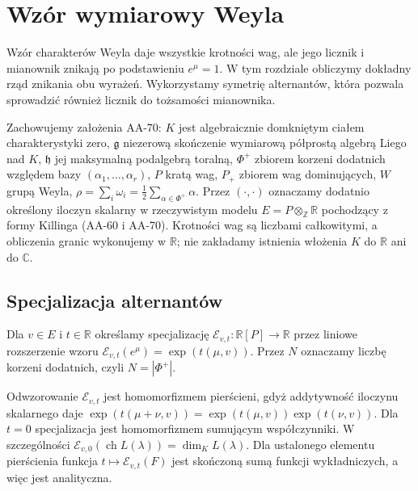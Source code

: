 \chapter{Wzór wymiarowy Weyla}
\label{aa:ch:weyl-dimension}

Wzór charakterów Weyla daje wszystkie krotności wag, ale jego licznik i mianownik znikają po podstawieniu $e^\mu=1$. W tym rozdziale obliczymy dokładny rząd znikania obu wyrażeń. Wykorzystamy symetrię alternantów, która pozwala sprowadzić również licznik do tożsamości mianownika.

Zachowujemy założenia AA-70: $K$ jest algebraicznie domkniętym ciałem charakterystyki zero, $\mathfrak g$ niezerową skończenie wymiarową półprostą algebrą Liego nad $K$, $\mathfrak h$ jej maksymalną podalgebrą toralną, $\Phi^+$ zbiorem korzeni dodatnich względem bazy $(\alpha_1,\ldots,\alpha_r)$, $P$ kratą wag, $P_+$ zbiorem wag dominujących, $W$ grupą Weyla, $\rho=\sum_i\omega_i=\frac12\sum_{\alpha\in\Phi^+}\alpha$. Przez $(\cdot,\cdot)$ oznaczamy dodatnio określony iloczyn skalarny w rzeczywistym modelu $E=P\otimes_{\mathbb Z}\mathbb R$ pochodzący z formy Killinga (AA-60 i AA-70). Krotności wag są liczbami całkowitymi, a obliczenia granic wykonujemy w $\mathbb R$; nie zakładamy istnienia włożenia $K$ do $\mathbb R$ ani do $\mathbb C$.

\section{Specjalizacja alternantów}

\begin{definicja}
\label{aa:def:weyl-exponential-specialization}
Dla $v\in E$ i $t\in\mathbb R$ określamy specjalizację
$\mathcal E_{v,t}:\mathbb R[P]\to\mathbb R$ przez liniowe rozszerzenie wzoru
$\mathcal E_{v,t}(e^\mu)=\exp(t(\mu,v))$.
Przez $N$ oznaczamy liczbę korzeni dodatnich, czyli $N=|\Phi^+|$.
\end{definicja}
Odwzorowanie $\mathcal E_{v,t}$ jest homomorfizmem pierścieni, gdyż addytywność iloczynu skalarnego daje
$\exp(t(\mu+\nu,v))=\exp(t(\mu,v))\exp(t(\nu,v))$.
Dla $t=0$ specjalizacja jest homomorfizmem sumującym współczynniki. W szczególności
$\mathcal E_{v,0}(\operatorname{ch}L(\lambda))=\dim_K L(\lambda)$.
Dla ustalonego elementu pierścienia funkcja $t\mapsto\mathcal E_{v,t}(F)$ jest skończoną sumą funkcji wykładniczych, a więc jest analityczna.

